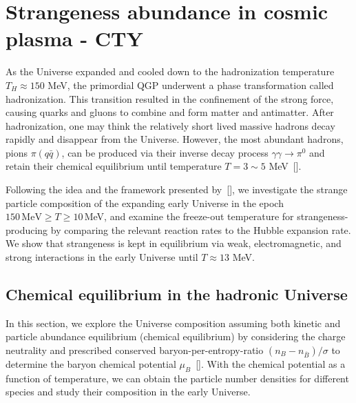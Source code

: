 \section{Strangeness abundance in cosmic plasma - CTY}
\label{Strangeness}
As the Universe expanded and cooled down to the hadronization temperature $T_H\approx150$ MeV, the primordial QGP underwent a phase transformation called hadronization. This transition resulted in the confinement of the strong force, causing quarks and gluons to combine and form matter 
and antimatter. After hadronization, one may think the relatively short lived massive hadrons decay rapidly and disappear from the Universe. However, the most abundant hadrons, pions $\pi(q\bar q)$, can be produced via their inverse decay process $\gamma\gamma\rightarrow\pi^0$ and retain their chemical equilibrium until temperature $T=3\sim5$ MeV~[\cite{Kuznetsova:2008jt}]. 

Following the idea and the framework presented by~[\cite{Kuznetsova:2008jt}], we investigate the strange particle composition of the expanding early Universe in the epoch $150\,\mathrm{MeV}\ge T\ge 10$\,MeV, and examine the freeze-out temperature for strangeness-producing  by comparing the relevant reaction rates to the Hubble expansion rate. We show that strangeness is kept in equilibrium via weak, electromagnetic, and strong interactions in the early Universe until $T\approx13$ MeV.


 




\subsection{Chemical equilibrium in the hadronic Universe}

In this section, we explore the Universe composition assuming both kinetic and particle abundance equilibrium (chemical equilibrium) by considering the charge neutrality and prescribed conserved baryon-per-entropy-ratio ${(n_B-n_{\overline{B}})}/{\sigma}$ to determine the baryon chemical potential $\mu_B$~[\cite{Fromerth:2012fe,Rafelski:2013yka}]. With the chemical potential as a function of temperature, we can obtain the particle number densities for different species and study their composition in the early Universe.

